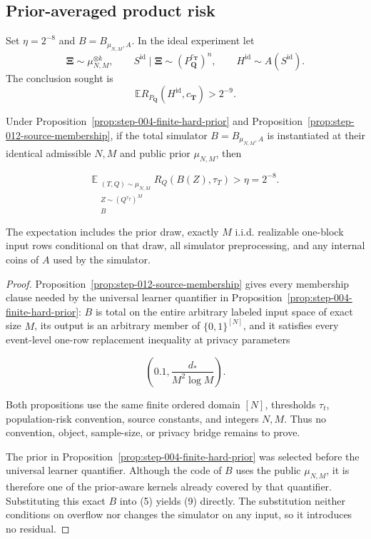 \subsection{Prior-averaged product risk}\label{app:step-013}
Set $\eta=2^{-8}$ and $B=B_{\mu_{N,M},A}$.  In the ideal experiment let
\begin{equation}
\boldsymbol\Xi\sim\mu_{N,M}^{\otimes k},
\qquad
S^{\mathrm{id}}\mid\boldsymbol\Xi
\sim(P_{\boldsymbol Q}^{c_{\boldsymbol T}})^n,
\qquad
H^{\mathrm{id}}\sim A(S^{\mathrm{id}}).
\tag{3}\label{eq:product-lower-experiment}
\end{equation}
The conclusion sought is
\begin{equation}
\mathbb E R_{P_{\boldsymbol Q}}(H^{\mathrm{id}},c_{\boldsymbol T})
>2^{-9}.
\tag{4}\label{eq:prior-product-lower}
\end{equation}
\begin{proposition}\label{prop:step-013-simulator-hardness}
Under Proposition~\ref{prop:step-004-finite-hard-prior} and
Proposition~\ref{prop:step-012-source-membership}, if the total
simulator \(B=B_{\mu_{N,M},A}\) is instantiated at their identical
admissible \(N,M\) and public prior \(\mu_{N,M}\), then

\[
\mathbb E_{\substack{(T,Q)\sim\mu_{N,M}\\
                      Z\sim(Q^{\tau_T})^M\\ B}}
R_Q(B(Z),\tau_T)>\eta=2^{-8}.
\tag{9}
\]

The expectation includes the prior draw, exactly \(M\) i.i.d. realizable
one-block input rows conditional on that draw, all simulator preprocessing,
and any internal coins of \(A\) used by the simulator.
\end{proposition}

\begin{proof}
Proposition~\ref{prop:step-012-source-membership} gives every
membership clause needed by the universal learner quantifier in Proposition~\ref{prop:step-004-finite-hard-prior}: \(B\) is total on the
entire arbitrary labeled input space of exact size \(M\), its output is an
arbitrary member of \(\{0,1\}^{[N]}\), and it satisfies every event-level
one-row replacement inequality at privacy parameters

\[
\left(0.1,\frac{d_*}{M^2\log M}\right).
\tag{10}
\]

Both propositions use the same finite ordered domain \([N]\),
thresholds \(\tau_t\), population-risk convention, source constants, and
integers \(N,M\). Thus no convention, object, sample-size, or privacy bridge
remains to prove.

The prior in Proposition~\ref{prop:step-004-finite-hard-prior} was selected
before the universal learner
quantifier. Although the code of \(B\) uses the public
\(\mu_{N,M}\), it is therefore one of the prior-aware kernels already
covered by that quantifier. Substituting this exact \(B\) into (5) yields
(9) directly. The substitution neither conditions on overflow nor changes
the simulator on any input, so it introduces no residual. \end{proof}

